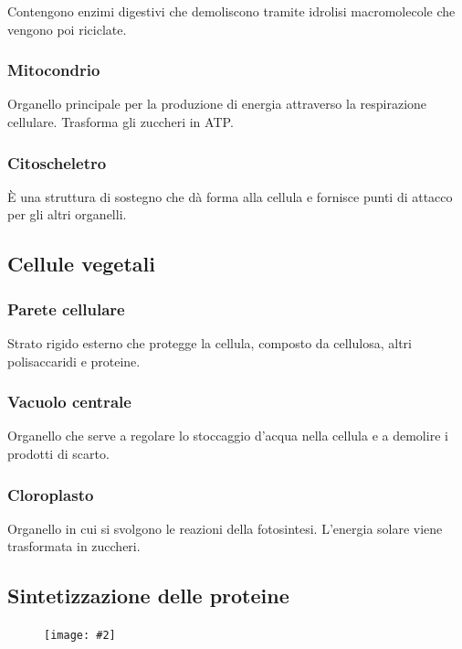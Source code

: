 \documentclass{article}
\newcommand{\cfig}[2]{
    \phantom{}
    \begin{figure}[ht!]
        \begin{center}
            \texttt{[image: \#2]}
        \end{center}
    \end{figure}
}
\begin{document}
Contengono enzimi digestivi che demoliscono tramite idrolisi macromolecole che vengono poi
riciclate.

\subsubsection{Mitocondrio}
Organello principale per la produzione di energia attraverso la respirazione cellulare.
Trasforma gli zuccheri in ATP.

\subsubsection{Citoscheletro}
È una struttura di sostegno che dà forma alla cellula e fornisce punti di attacco per gli
altri organelli.

\subsection{Cellule vegetali}
\subsubsection{Parete cellulare}
Strato rigido esterno che protegge la cellula, composto da cellulosa, altri polisaccaridi e
proteine.

\subsubsection{Vacuolo centrale}
Organello che serve a regolare lo stoccaggio d'acqua nella cellula e a demolire i prodotti di
scarto.

\subsubsection{Cloroplasto}
Organello in cui si svolgono le reazioni della fotosintesi. L'energia solare viene trasformata
in zuccheri.

\newpage
\subsection{Sintetizzazione delle proteine}
\cfig{.8}{media/sint-proteine}
\end{document}
